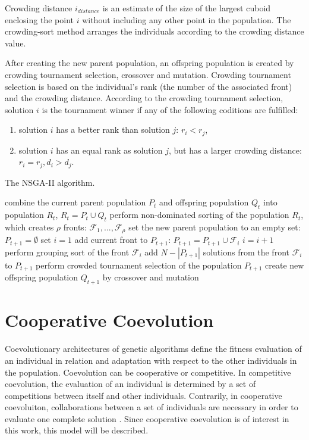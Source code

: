 Crowding distance $i_{distance}$ is an estimate of the size of the largest cuboid enclosing the point $i$ without including any other point in the population. 
The crowding-sort method arranges the individuals according to the crowding distance value.

After creating the new parent population, an offspring population is created by crowding tournament selection, crossover and mutation. 
Crowding tournament selection is based on the individual's rank (the number of the associated front) and the crowding distance. 
According to the crowding tournament selection, solution $i$ is the tournament winner if any of the following coditions are fulfilled:
\begin{enumerate}
	\item solution $i$ has a better rank than solution $j$: $r_i < r_j$,
	\item solution $i$ has an equal rank as solution $j$, but has a larger crowding distance: $r_i=r_j, d_i > d_j$.
\end{enumerate}

\begin{algorithm}
\caption{The NSGA-II algorithm.\label{nsga-ii}}
\begin{algorithmic}
\STATE combine the current parent population $P_t$ and offspring population $Q_t$ into population $R_t$, $R_t = P_t \cup Q_t$
\STATE perform non-dominated sorting of the population $R_t$, which creates $\rho$ fronts: 
$\mathcal{F}_1, ..., \mathcal{F}_\rho$ 
\STATE set the new parent population to an empty set: $P_{t+1} = \emptyset$
\STATE set $i=1$
\STATE add current front to $P_{t+1}$: $P_{t+1} = P_{t+1} \cup \mathcal{F}_i$
\STATE $i=i+1$
\ENDWHILE
\STATE perform grouping sort of the front $\mathcal{F}_i$
\STATE add $N-|P_{t+1}|$ solutions from the front $\mathcal{F}_i$ to $P_{t+1}$
\STATE perform crowded tournament selection of the population $P_{t+1}$
\STATE create new offspring population $Q_{t+1}$ by crossover and mutation
\end{algorithmic}
\end{algorithm}

\section{Cooperative Coevolution}
Coevolutionary architectures of genetic algorithms define the fitness evaluation of an individual in relation and adaptation with respect to the other individuals in the population. 
Coevolution can be cooperative or competitive. 
In competitive coevolution, the evaluation of an individual is determined by a set of competitions between itself and other individuals. 
Contrarily, in cooperative coevoluiton, collaborations between a set of individuals are necessary in order to evaluate one complete solution \cite{stoean2014support}. 
Since cooperative coevolution is of interest in this work, this model will be described. 

